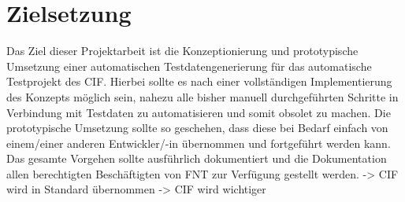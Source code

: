 \section{Zielsetzung}\label{sec:zielsetzung}
Das Ziel dieser Projektarbeit ist die Konzeptionierung und prototypische Umsetzung einer automatischen Testdatengenerierung für das automatische Testprojekt des \ac{CIF}. Hierbei sollte es nach einer vollständigen Implementierung des Konzepts möglich sein, nahezu alle bisher manuell durchgeführten Schritte in Verbindung mit Testdaten zu automatisieren und somit obsolet zu machen. Die prototypische Umsetzung sollte so geschehen, dass diese bei Bedarf einfach von einem/einer anderen Entwickler/-in übernommen und fortgeführt werden kann. Das gesamte Vorgehen sollte ausführlich dokumentiert und die Dokumentation allen berechtigten Beschäftigten von FNT zur Verfügung gestellt werden.
-> CIF wird in Standard übernommen -> CIF wird wichtiger